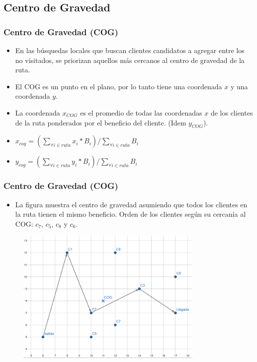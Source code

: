 \documentclass{beamer}
\begin{document}

\subsection{Centro de Gravedad}

\begin{frame}
\frametitle{Centro de Gravedad (COG)}

\begin{itemize}
    \item En las búsquedas locales que buscan clientes candidatos a agregar entre los no visitados, se priorizan aquellos más cercanos al centro de gravedad de la ruta.
    \pause 
    \item El COG es un punto en el plano, por lo tanto tiene una coordenada $x$ y una coordenada $y$.
    \pause 
    \item La coordenada $x_{COG}$ es el promedio de todas las coordenadas $x$ de los clientes de la ruta ponderados por el beneficio del cliente. (Idem $y_{COG}$).
    \pause 
    \item $x_{cog} = (\sum_{\forall i \in ruta} x_i * B_i) / \sum_{\forall i \in ruta} B_i$
    \pause 
    \item $y_{cog} = (\sum_{\forall i \in ruta} y_i * B_i) / \sum_{\forall i \in ruta} B_i$
\end{itemize}

\end{frame}


\begin{frame}
\frametitle{Centro de Gravedad (COG)}

\begin{itemize}
    \item La figura muestra el centro de gravedad asumiendo que todos los clientes en la ruta tienen el mismo beneficio. Orden de los clientes según su cercanía al COG: $c_7$, $c_5$, $c_8$ y $c_6$.
\end{itemize}

\begin{figure}[h]
	\centering
	\includegraphics[width=9cm]{COG}
	\label{fig:COG}
\end{figure}

\end{frame}
\end{document}
